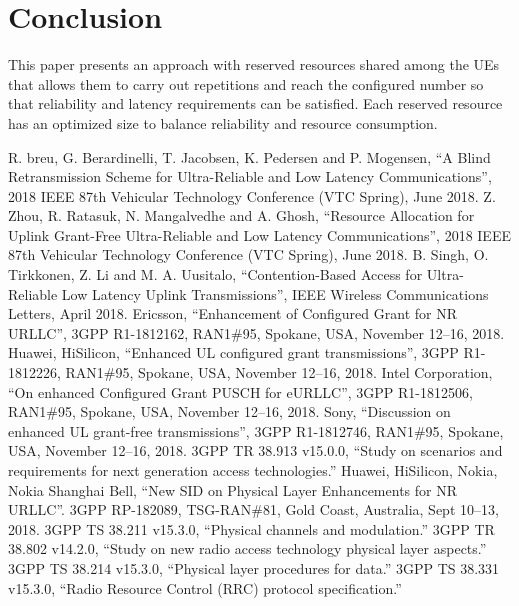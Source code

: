 \documentclass[conference]{IEEEtran}
\begin{document}
\section{Conclusion}\label{IV}

This paper presents an approach with reserved resources shared among the UEs that allows them to carry out repetitions and reach the configured number so that reliability and latency requirements can be  satisfied. Each reserved resource has an optimized size to balance reliability and  resource consumption. 

\begin{thebibliography}{00}
 R. breu, G. Berardinelli, T. Jacobsen, K. Pedersen and P. Mogensen, ``A Blind Retransmission Scheme for Ultra-Reliable and Low Latency Communications'', 2018 IEEE 87th Vehicular Technology Conference (VTC Spring), June 2018.
 Z. Zhou, R. Ratasuk, N. Mangalvedhe and A. Ghosh, ``Resource Allocation for Uplink Grant-Free Ultra-Reliable and Low Latency Communications'', 2018 IEEE 87th Vehicular Technology Conference (VTC Spring), June 2018.
 B. Singh, O. Tirkkonen, Z. Li and M. A. Uusitalo, ``Contention-Based Access for Ultra-Reliable Low Latency Uplink Transmissions'',  IEEE Wireless Communications Letters, April 2018.
 Ericsson, ``Enhancement of Configured Grant for NR URLLC'', 3GPP R1-1812162, RAN1\#95, Spokane, USA, November 12--16, 2018.
 Huawei, HiSilicon, ``Enhanced UL configured grant transmissions'', 3GPP R1-1812226, RAN1\#95, Spokane, USA, November 12--16, 2018.
 Intel Corporation, ``On enhanced Configured Grant PUSCH for eURLLC'', 3GPP R1-1812506, RAN1\#95, Spokane, USA, November 12--16, 2018.
 Sony, ``Discussion on enhanced UL grant-free transmissions'', 3GPP R1-1812746, RAN1\#95, Spokane, USA, November 12--16, 2018.
 3GPP TR 38.913 v15.0.0, ``Study on scenarios and requirements for next generation access technologies.''
 Huawei, HiSilicon, Nokia, Nokia Shanghai Bell, ``New SID on Physical Layer Enhancements for NR URLLC''. 3GPP RP-182089, TSG-RAN\#81, Gold Coast, Australia, Sept 10--13, 2018.
 3GPP TS 38.211 v15.3.0, ``Physical channels and modulation.''
 3GPP TR 38.802 v14.2.0, ``Study on new radio access technology physical layer aspects.''
 3GPP TS 38.214 v15.3.0, ``Physical layer procedures for data.''
 3GPP TS 38.331 v15.3.0, ``Radio Resource Control (RRC) protocol specification.''

\end{thebibliography}
\vspace{12pt}
\end{document}
